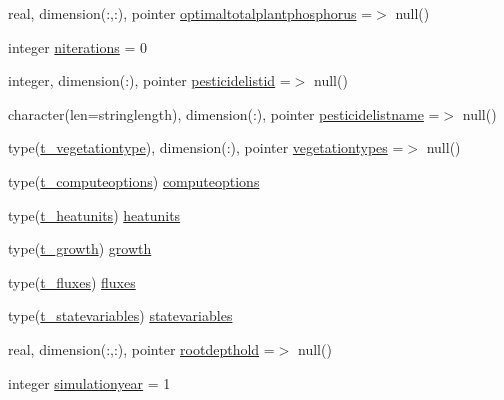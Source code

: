 \begin{DoxyCompactItemize}
\item 
real, dimension(\+:,\+:), pointer \mbox{\hyperlink{structmodulevegetation_1_1t__vegetation_acb70be3dd100929e8706cee9c7e48860}{optimaltotalplantphosphorus}} =$>$ null()
\item 
integer \mbox{\hyperlink{structmodulevegetation_1_1t__vegetation_af68fafaadb6433348bda4796df705ce4}{niterations}} = 0
\item 
integer, dimension(\+:), pointer \mbox{\hyperlink{structmodulevegetation_1_1t__vegetation_af9156815e87a081d33a00a0b594601e2}{pesticidelistid}} =$>$ null()
\item 
character(len=stringlength), dimension(\+:), pointer \mbox{\hyperlink{structmodulevegetation_1_1t__vegetation_a7042a349048f41faed567c55a5dd0f8d}{pesticidelistname}} =$>$ null()
\item 
type(\mbox{\hyperlink{structmodulevegetation_1_1t__vegetationtype}{t\+\_\+vegetationtype}}), dimension(\+:), pointer \mbox{\hyperlink{structmodulevegetation_1_1t__vegetation_a5d52c7e26bec394a20de0c4d06d17f97}{vegetationtypes}} =$>$ null()
\item 
type(\mbox{\hyperlink{structmodulevegetation_1_1t__computeoptions}{t\+\_\+computeoptions}}) \mbox{\hyperlink{structmodulevegetation_1_1t__vegetation_a43fef8f1774079bf47652dde46cd5b56}{computeoptions}}
\item 
type(\mbox{\hyperlink{structmodulevegetation_1_1t__heatunits}{t\+\_\+heatunits}}) \mbox{\hyperlink{structmodulevegetation_1_1t__vegetation_a7b8e87082c2220824995f0c4de17ebbb}{heatunits}}
\item 
type(\mbox{\hyperlink{structmodulevegetation_1_1t__growth}{t\+\_\+growth}}) \mbox{\hyperlink{structmodulevegetation_1_1t__vegetation_a760e76b5a688317d1116c8805d452fc8}{growth}}
\item 
type(\mbox{\hyperlink{structmodulevegetation_1_1t__fluxes}{t\+\_\+fluxes}}) \mbox{\hyperlink{structmodulevegetation_1_1t__vegetation_ad5a79be17d204e4eca260366ee4cc108}{fluxes}}
\item 
type(\mbox{\hyperlink{structmodulevegetation_1_1t__statevariables}{t\+\_\+statevariables}}) \mbox{\hyperlink{structmodulevegetation_1_1t__vegetation_aab6dc42849032f221f21232b0d170337}{statevariables}}
\item 
real, dimension(\+:,\+:), pointer \mbox{\hyperlink{structmodulevegetation_1_1t__vegetation_a003b3dd898552416fc686da12a9267ba}{rootdepthold}} =$>$ null()
\item 
integer \mbox{\hyperlink{structmodulevegetation_1_1t__vegetation_adbaea6e58562f54a814c1513e6f110a5}{simulationyear}} = 1

\end{DoxyCompactItemize}
